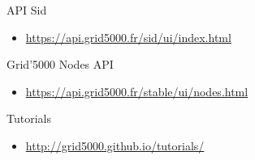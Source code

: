 API Sid
\begin{itemize}
\item \url{https://api.grid5000.fr/sid/ui/index.html}
\end{itemize}
Grid'5000 Nodes API
\begin{itemize}
\item \url{https://api.grid5000.fr/stable/ui/nodes.html}
\end{itemize}
Tutorials
\begin{itemize}
\item \url{http://grid5000.github.io/tutorials/}
\end{itemize}